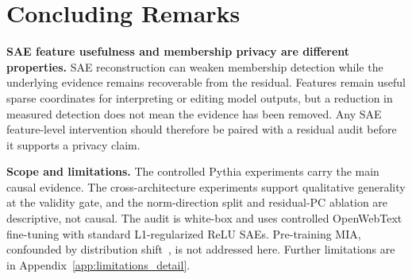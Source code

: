 \documentclass{article}
\theoremstyle{plain}
\theoremstyle{definition}
\theoremstyle{remark}
\begin{document}





\section{Concluding Remarks}
\label{sec:concluding}

\textbf{SAE feature usefulness and membership privacy are different properties.}
SAE reconstruction can weaken membership detection while the underlying evidence remains recoverable from the residual. Features remain useful sparse coordinates for interpreting or editing model outputs, but a reduction in measured detection does not mean the evidence has been removed. Any SAE feature-level intervention should therefore be paired with a residual audit before it supports a privacy claim.

\textbf{Scope and limitations.}
The controlled Pythia experiments carry the main causal evidence. The cross-architecture experiments support qualitative generality at the validity gate, and the norm-direction split and residual-PC ablation are descriptive, not causal. The audit is white-box and uses controlled OpenWebText fine-tuning with standard L1-regularized ReLU SAEs. Pre-training MIA, confounded by distribution shift~\citep{duan2024membership}, is not addressed here. Further limitations are in Appendix~\ref{app:limitations_detail}.




\appendix

\end{document}
